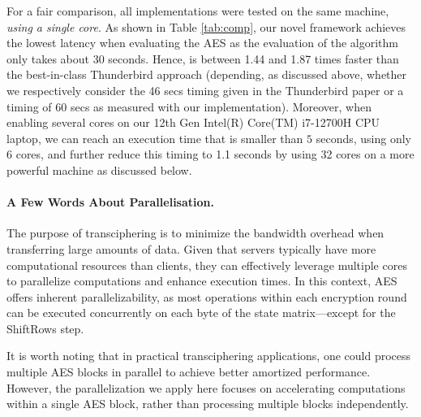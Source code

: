 For a fair comparison, all implementations were tested on the same machine, \emph{using a single core}. As shown in Table \ref{tab:comp}, our novel framework achieves the lowest latency when evaluating the AES as the evaluation of the algorithm only takes about 30 seconds. Hence, \hippo{} is between 1.44 and 1.87 times faster than the best-in-class Thunderbird approach (depending, as discussed above, whether we respectively consider the 46 secs timing given in the Thunderbird paper or a timing of 60 secs as measured with our implementation).
Moreover, when enabling several cores on our 12th Gen Intel(R) Core(TM) i7-12700H CPU laptop, we can reach an execution time that is smaller than $5$ seconds, using only 6 cores, and further reduce this timing to 1.1 seconds by using 32 cores on a more powerful machine as discussed below.

\paragraph{A Few Words About Parallelisation.}
The purpose of transciphering is to minimize the bandwidth overhead when transferring large amounts of data. Given that servers typically have more computational resources than clients, they can effectively leverage multiple cores to parallelize computations and enhance execution times. In this context, AES offers inherent parallelizability, as most operations within each encryption round can be executed concurrently on each byte of the state matrix—except for the ShiftRows step.

It is worth noting that in practical transciphering applications, one could process multiple AES blocks in parallel to achieve better amortized performance. However, the parallelization we apply here focuses on accelerating computations within a single AES block, rather than processing multiple blocks independently.

